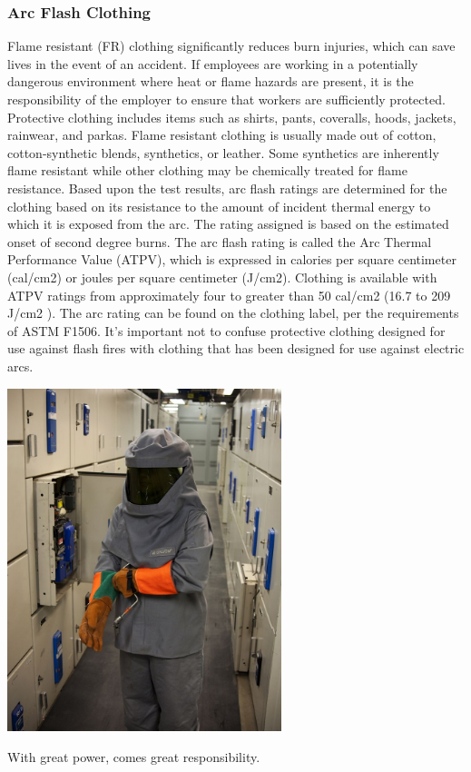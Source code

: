 \documentclass[11pt,a4paper]{article}
\begin{document}
\subsubsection*{Arc Flash Clothing}
Flame resistant (FR) clothing significantly reduces burn injuries, which can save lives in the event of an accident. If employees are working in a potentially dangerous environment where heat or flame hazards are present, it is the responsibility of the employer to ensure that workers are sufficiently protected. Protective clothing includes items such as shirts, pants, coveralls, hoods, jackets, rainwear, and parkas. Flame resistant clothing is usually made out of cotton, cotton-synthetic blends, synthetics, or leather. Some synthetics are inherently flame resistant while other clothing may be chemically treated for flame resistance. Based upon the test results, arc flash ratings are determined for the clothing based on its resistance to the amount of incident thermal energy to which it is exposed from the arc. The rating assigned is based on the estimated onset of second degree burns.
The arc flash rating is called the Arc Thermal Performance Value (ATPV), which is expressed in calories per square centimeter (cal/cm2) or joules per square centimeter (J/cm2). Clothing is available with ATPV ratings from approximately four to greater than 50 cal/cm2 (16.7 to 209 J/cm2 ).
The arc rating can be found on the clothing label, per the requirements of ASTM F1506. It's important not to confuse protective clothing designed for use against flash fires with clothing that has been designed for use against electric arcs.
\begin{center}
  \includegraphics[width=8cm]{arcflashsuit.jpg}\par
  With great power, comes great responsibility.
  \end{center}
\end{document}
